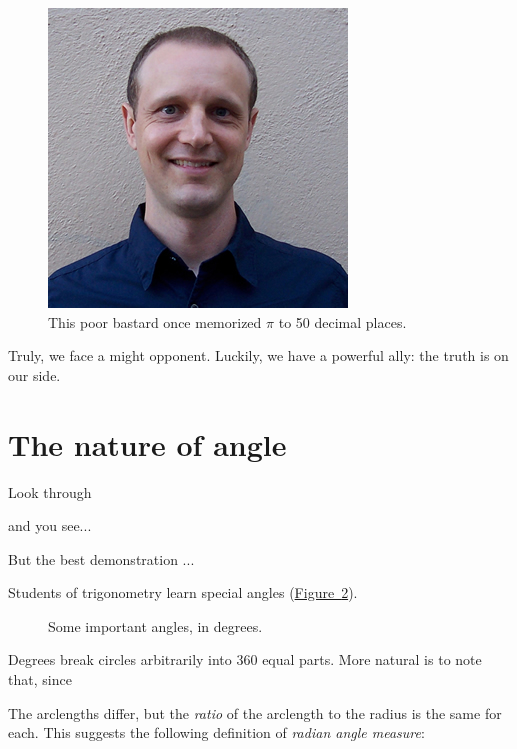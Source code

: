 \documentclass{article}
\begin{document}
\begin{figure}
\begin{center}
\includegraphics{images/figures/michael_hartl.jpg}
\end{center}
\caption{This poor bastard once memorized $\pi$ to 50 decimal places.\label{fig:michael_hartl}}
\end{figure}

Truly, we face a might opponent. Luckily, we have a powerful ally: the truth is on our side.


\section{The nature of angle} %

Look through 

and you see...

But the best demonstration ...

Students of trigonometry learn special angles (\hyperref[fig:degree-angles]{Figure~}\ref{fig:degree-angles}).

\begin{figure}
\begin{center}
\end{center}
\caption{Some important angles, in degrees.\label{fig:degree-angles}}
\end{figure}

Degrees break circles arbitrarily into 360 equal parts. More natural is to note that, since 

The arclengths differ, but the \emph{ratio} of the arclength to the radius is the same for each. This suggests the following definition of \emph{radian angle measure}:
\end{document}
